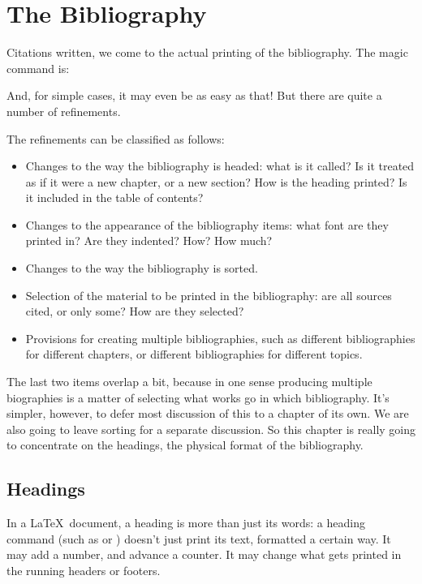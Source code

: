 \chapter{The Bibliography}
\label{ch:bibliographyformat}

Citations written, we come to the actual printing of the
bibliography. The magic command is:
\begin{center}
\end{center}
And, for simple cases, it may even be as easy as that! But there are
quite a number of refinements.

The refinements can be classified as follows:
\begin{itemize}
\item Changes to the way the bibliography is headed: what is it
  called? Is it treated as if it were a new chapter, or a new section?
  How is the heading printed? Is it included in the table of contents?
\item Changes to the appearance of the bibliography items: what font
  are they printed in? Are they indented? How? How much?
\item Changes to the way the bibliography is sorted.
\item Selection of the material to be printed in the bibliography: are
  all sources cited, or only some? How are they selected?
\item Provisions for creating multiple bibliographies, such as
  different bibliographies for different chapters, or different
  bibliographies for different topics.
\end{itemize}
The last two items overlap a bit, because in one sense producing
multiple biographies is a matter of selecting what works go in which
bibliography. It's simpler, however, to defer most discussion of this
to a chapter of its own. We are
also going to leave sorting for a separate discussion. So this chapter
is really going to concentrate on the headings, the physical format of
the bibliography.

\section{Headings}

In a \LaTeX\ document, a heading is more than just its words: a
heading command (such as  or ) doesn't just
print its text, formatted a certain way. It may add a number, and
advance a counter. It may change what gets printed in the running
headers or footers.

